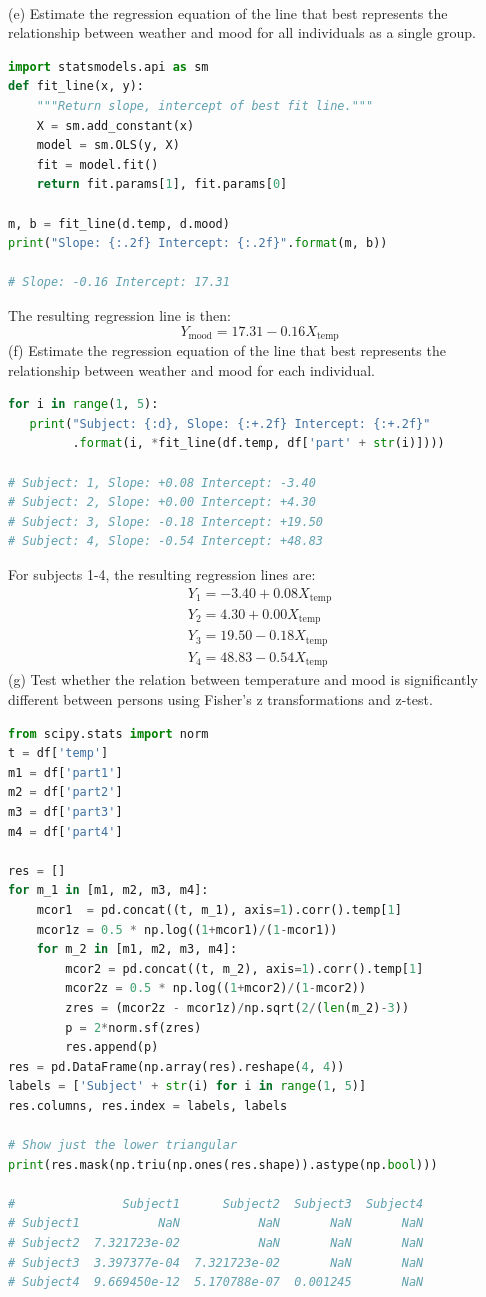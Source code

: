 \documentclass[onecolumn,10pt]{jhwhw}
\begin{document}
\\
(e) Estimate the regression equation of the line that best represents the relationship between weather and mood for all individuals as a single group.
\begin{lstlisting}[language=Python]
import statsmodels.api as sm
def fit_line(x, y):
    """Return slope, intercept of best fit line."""
    X = sm.add_constant(x)
    model = sm.OLS(y, X)
    fit = model.fit()
    return fit.params[1], fit.params[0]

m, b = fit_line(d.temp, d.mood)
print("Slope: {:.2f} Intercept: {:.2f}".format(m, b))

# Slope: -0.16 Intercept: 17.31
\end{lstlisting}
The resulting regression line is then:
$$
Y_{\mbox{mood}} = 17.31 - 0.16 X_{\mbox{temp}}
$$
(f) Estimate the regression equation of the line that best represents the relationship between weather and mood for each individual.
\begin{lstlisting}[language=Python]
for i in range(1, 5):
   print("Subject: {:d}, Slope: {:+.2f} Intercept: {:+.2f}"
         .format(i, *fit_line(df.temp, df['part' + str(i)])))

# Subject: 1, Slope: +0.08 Intercept: -3.40
# Subject: 2, Slope: +0.00 Intercept: +4.30
# Subject: 3, Slope: -0.18 Intercept: +19.50
# Subject: 4, Slope: -0.54 Intercept: +48.83
\end{lstlisting}
For subjects 1-4, the resulting regression lines are:
\begin{align*}
Y_{1} = -3.40  +0.08 X_{\mbox{temp}}\\
Y_{2} = 4.30  +0.00 X_{\mbox{temp}}\\
Y_{3} = 19.50 -0.18 X_{\mbox{temp}}\\
Y_{4} = 48.83 -0.54 X_{\mbox{temp}}
\end{align*}
(g) Test whether the relation between temperature and mood is significantly different between persons using Fisher's z transformations and z-test.
\begin{lstlisting}[language=Python]
from scipy.stats import norm
t = df['temp']
m1 = df['part1']
m2 = df['part2']
m3 = df['part3']
m4 = df['part4']

res = []
for m_1 in [m1, m2, m3, m4]:
    mcor1  = pd.concat((t, m_1), axis=1).corr().temp[1]
    mcor1z = 0.5 * np.log((1+mcor1)/(1-mcor1))
    for m_2 in [m1, m2, m3, m4]:
        mcor2 = pd.concat((t, m_2), axis=1).corr().temp[1]
        mcor2z = 0.5 * np.log((1+mcor2)/(1-mcor2))
        zres = (mcor2z - mcor1z)/np.sqrt(2/(len(m_2)-3))
        p = 2*norm.sf(zres)
        res.append(p)
res = pd.DataFrame(np.array(res).reshape(4, 4))
labels = ['Subject' + str(i) for i in range(1, 5)]
res.columns, res.index = labels, labels

# Show just the lower triangular
print(res.mask(np.triu(np.ones(res.shape)).astype(np.bool)))

#               Subject1      Subject2  Subject3  Subject4
# Subject1           NaN           NaN       NaN       NaN
# Subject2  7.321723e-02           NaN       NaN       NaN
# Subject3  3.397377e-04  7.321723e-02       NaN       NaN
# Subject4  9.669450e-12  5.170788e-07  0.001245       NaN
\end{lstlisting}
\end{document}

